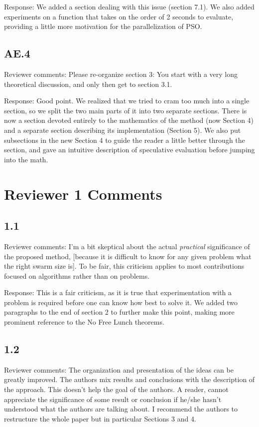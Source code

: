 \documentclass[onecolumn, 12pt]{article}
\begin{document}
Response: We added a section dealing with this issue (section 7.1).  We also
added experiments on a function that takes on the order of 2 seconds to
evaluate, providing a little more motivation for the parallelization of PSO.

\subsection*{AE.4}

Reviewer comments: Please re-organize section 3: You start with a very long
theoretical discussion, and only then get to section 3.1.

Response: Good point.  We realized that we tried to cram too much into a single
section, so we split the two main parts of it into two separate sections.
There is now a section devoted entirely to the mathematics of the method (now
Section 4) and a separate section describing its implementation (Section 5).
We also put subsections in the new Section 4 to guide the reader a little
better through the section, and gave an intuitive description of speculative
evaluation before jumping into the math.

\section*{Reviewer 1 Comments}

\subsection*{1.1}

Reviewer comments: I'm a bit skeptical about the actual \emph{practical}
significance of the proposed method, [because it is difficult to know for any
given problem what the right swarm size is]. To be fair, this criticism applies
to most contributions focused on algorithms rather than on problems.

Response: This is a fair criticism, as it is true that experimentation with a
problem is required before one can know how best to solve it.  We added two
paragraphs to the end of section 2 to further make this point, making more
prominent reference to the No Free Lunch theorems.

\subsection*{1.2}

Reviewer comments: The organization and presentation of the ideas can be
greatly improved. The authors mix results and conclusions with the description
of the approach. This doesn't help the goal of the authors. A reader, cannot
appreciate the significance of some result or conclusion if he/she hasn't
understood what the authors are talking about. I recommend the authors to
restructure the whole paper but in particular Sections 3 and 4.
\end{document}

